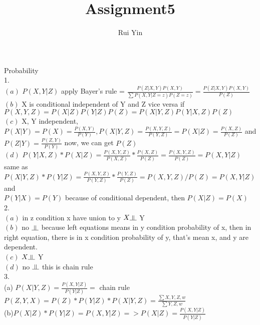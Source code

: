 \documentclass[12pt]{article}
\newcommand{\indep}{\rotatebox[origin=c]{90}{$\models$}}
\newenvironment{problem}[2][Problem]{\begin{trivlist}
\item[\hskip \labelsep {\bfseries #1}\hskip \labelsep {\bfseries #2.}]}{\end{trivlist}}
\begin{document}
 
\title{Assignment5}
\author{Rui Yin}
 
\maketitle

\begin{problem}{1}Probability\\
1.\\
$(a)$ $P(X,Y|Z)$ apply Bayer's rule =  $\frac{P(Z|X,Y)P(X,Y)}{\sum{P(X,Y|Z=z)P(Z = z)}} = \frac{P(Z|X,Y)P(X,Y)}{P(Z)}$\\
$(b)$ X is conditional independent of Y and Z vice versa if $P(X,Y,Z) = P(X|Z)P(Y|Z)P(Z) = P(X|Y,Z)P(Y|X,Z)P(Z)$\\
$(c)$ X, Y independent, $P(X|Y) = P(X) = \frac{P(X,Y)}{P(Y)}, P(X|Y, Z) =  \frac{P(X,Y,Z)}{P(Y,Z)} =P(X|Z) = \frac{P(X,Z)}{P(Z)}$ and $ P(Z|Y) = \frac{P(Z,Y)}{P(Y)}$ now, we can get $P(Z)$ \\
$(d)$ $P(Y|X,Z) * P(X|Z) = \frac{P(X,Y,Z)}{P(X,Z)}*\frac{P(X,Z)}{P(Z)} = \frac{P(X,Y,Z)}{P(Z)} = P(X,Y|Z)$ same as \\
$P(X|Y,Z)*P(Y|Z) = \frac{P(X,Y,Z)}{P(Y,Z)}*\frac{P(Y,Z)}{P(Z)}=P(X,Y,Z)/P(Z) = P(X,Y|Z)$ and\\
$P(Y|X) = P(Y)$ because of conditional dependent, then $P(X|Z) = P(X)$\\
2.\\
$(a)$ in z condition x have union to y $X\indep $ Y\\
$(b)$ no $\indep$ because left equations means in y condition probability of x, then in right equation, there is in x condition probability of y, that's mean x, and y are dependent.\\
$(c)$ $X\indep $ Y\\
$(d)$ no  $\indep$ this is chain rule\\
3.\\
(a) $P(X|Y,Z) = \frac{P(X,Y|Z)}{P(Y|Z)} =$ chain rule$P(Z,Y,X) = P(Z)*P(Y|Z)*P(X|Y,Z) = \frac{\sum{X,Y,Z,w}}{\sum{Y,Z,w}}$ \\
(b)$P(X|Z)*P(Y|Z) = P(X,Y|Z) => P(X|Z) = \frac{P(X,Y|Z)}{P(Y|Z)} $\\

\end{problem}
\end{document}
